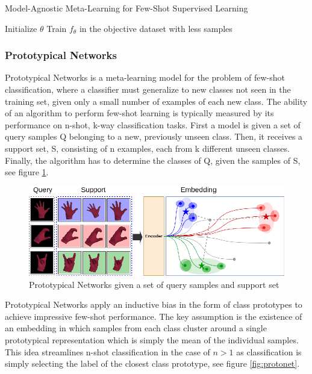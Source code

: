 \begin{algorithm}[!h]
\caption{Model-Agnostic Meta-Learning for Few-Shot Supervised Learning}
\SetAlgoLined
{}
 Initialize $\theta$\;
 Train $f_\theta$ in the objective dataset with less samples
\end{algorithm}

\subsubsection{Prototypical Networks}
\label{models:protonet}

Prototypical Networks \cite{protonet} is a meta-learning model for the problem of few-shot classification, where a classifier must generalize to new classes not seen in the training set, given only a small number of examples of each new class. The ability of an algorithm to perform few-shot learning is typically measured by its performance on n-shot, k-way classification tasks. First a model is given a set of query samples Q belonging to a new, previously unseen class. Then, it receives a support set, S, consisting of n examples, each from k different unseen classes. Finally, the algorithm has to determine the classes of Q, given the samples of S, see figure \ref{fig:protonet:handshape}.

\begin{figure}[!ht]
    \centerline{\includegraphics[width=1.0\columnwidth]{images/background/protonets.png}}
    \caption{Prototypical Networks given a set of query samples and support set}
    \label{fig:protonet:handshape}
\end{figure}

Prototypical Networks apply an inductive bias in the form of class prototypes to achieve impressive few-shot performance. The key assumption is the existence of an embedding in which samples from each class cluster around a single prototypical representation which is simply the mean of the individual samples. This idea streamlines n-shot classification in the case of $n > 1$ as classification is simply selecting the label of the closest class prototype, see figure \ref{fig:protonet}.

